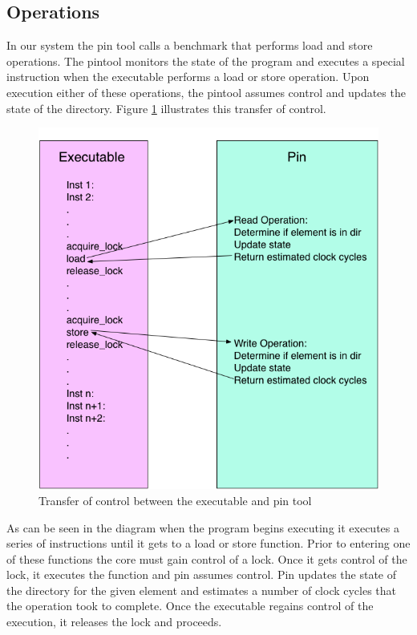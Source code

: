 \documentclass{article}
\begin{document}
\subsection{Operations}
In our system the pin tool calls a benchmark that performs load and store operations.  
The pintool monitors the state of the program and executes a special instruction when the executable performs a load or store operation.
Upon execution either of these operations, the pintool assumes control and updates the state of the directory.
Figure \ref{sd2} illustrates this transfer of control.
\begin{figure}[H]
\begin{center}
\includegraphics[scale=0.4]{images/sd2}
\end{center}
\caption{Transfer of control between the executable and pin tool}
\label{sd2}
\end{figure}

As can be seen in the diagram when the program begins executing it executes a series of instructions until it gets to a load or store function.
Prior to entering one of these functions the core must gain control of a lock.
Once it gets control of the lock, it executes the function and pin assumes control.  
Pin updates the state of the directory for the given element and estimates a number of clock cycles that the operation took to complete.
Once the executable regains control of the execution, it releases the lock and proceeds.
\end{document}
